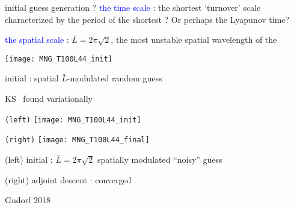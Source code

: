 \begin{frame}{initial guess generation ?}
 \textcolor{blue}{the time scale} : the shortest
`turnover' scale characterized by the period of the shortest \po? Or perhaps
the Lyapunov time?

\bigskip

\textcolor{blue}{the spatial scale} :
$\bar{L}=2\pi\sqrt{2}$, the  most unstable spatial wavelength of the \KS

\bigskip

\begin{minipage}[height=.32\textheight]{.30\textwidth}
\texttt{[image: MNG\_T100L44\_init]}
\end{minipage}

\medskip
initial : spatial $\bar{L}$-modulated random guess

\end{frame}

\begin{frame}{KS \twot\ found variationally}
\begin{minipage}[height=.72\textheight]{.40\textwidth}
\centering \small{\texttt{(left)}}
\texttt{[image: MNG\_T100L44\_init]}
\end{minipage}
\begin{minipage}[height=.72\textheight]{.40\textwidth}
\centering \small{\texttt{(right)}}
\texttt{[image: MNG\_T100L44\_final]}
\end{minipage}

\vfill
(left) initial : $\bar{L}=2\pi\sqrt{2}$ spatially modulated ``noisy'' guess

(right) adjoint descent : converged \twot\

\vfill\hfill        Gudorf 2018
\end{frame}


